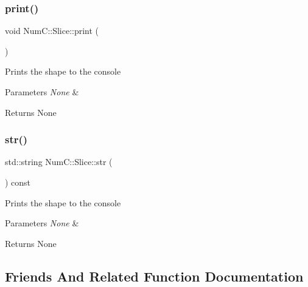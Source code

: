 \subsubsection{\texorpdfstring{print()}{print()}}
{\footnotesize\ttfamily void Num\+C\+::\+Slice\+::print (\begin{DoxyParamCaption}{ }\end{DoxyParamCaption})\hspace{0.3cm}{\ttfamily [inline]}}

Prints the shape to the console


\begin{DoxyParams}{Parameters}
{\em None} & \\
\hline
\end{DoxyParams}
\begin{DoxyReturn}{Returns}
None 
\end{DoxyReturn}
\mbox{\label{class_num_c_1_1_slice_a378c6115e027aa6f91a22fe246403e0a}} 
\subsubsection{\texorpdfstring{str()}{str()}}
{\footnotesize\ttfamily std\+::string Num\+C\+::\+Slice\+::str (\begin{DoxyParamCaption}{ }\end{DoxyParamCaption}) const\hspace{0.3cm}{\ttfamily [inline]}}

Prints the shape to the console


\begin{DoxyParams}{Parameters}
{\em None} & \\
\hline
\end{DoxyParams}
\begin{DoxyReturn}{Returns}
None 
\end{DoxyReturn}


\subsection{Friends And Related Function Documentation}
\mbox{\label{class_num_c_1_1_slice_ad6889d2df295fef3796aebb769b8cac0}} 
